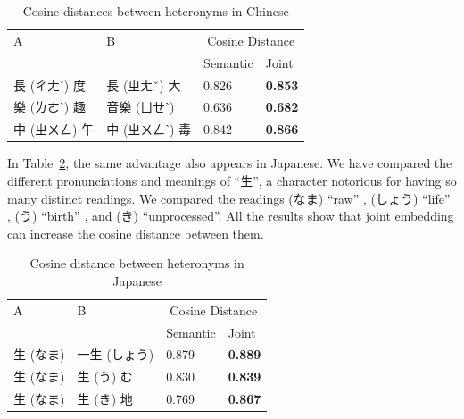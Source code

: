 \vspace{0.1cm}
\begin{table}[h]
    \centering
        \begin{tabularx}{\textwidth}{bbbb}
            \toprule
            \multirow{2.5}{*}{A} & \multirow{2.5}{*}{B} & \multicolumn{2}{c}{Cosine Distance} \\
            \cmidrule(lr){3-4} {} & {} & Semantic & Joint \\\midrule
            長 (ㄔㄤˊ) 度 & 長 (ㄓㄤˇ) 大 & 0.826 & \textbf{0.853} \\
            樂 (ㄌㄜˋ) 趣 & 音樂 (ㄩㄝˋ) & 0.636 & \textbf{0.682} \\
            中 (ㄓㄨㄥ) 午 & 中 (ㄓㄨㄥˋ) 毒 & 0.842 & \textbf{0.866} \\\bottomrule
        \end{tabularx}
    \caption{Cosine distances between heteronyms in Chinese}
    \label{tab:analysis_heteronym1}
\end{table}

\begin{CJK}{UTF8}{ipxm}
    In Table~\ref{tab:analysis_heteronym2}, the same advantage also appears in Japanese. We have compared the different pronunciations and meanings of ``生'', a character notorious for having so many distinct readings.  We compared the readings (なま) ``raw'' , (しょう) ``life'' , (う) ``birth'' , and (き) ``unprocessed''. All the results show that joint embedding can increase the cosine distance between them.
\end{CJK}

\vspace{0.1cm}    
\begin{table}[h]
    \centering
    \begin{CJK}{UTF8}{ipxm}
        \begin{tabularx}{\textwidth}{bbbb}
            \toprule
            \multirow{2.5}{*}{A} & \multirow{2.5}{*}{B} & \multicolumn{2}{c}{Cosine Distance} \\
            \cmidrule(lr){3-4} {} & {} & Semantic & Joint \\\midrule
            生 (なま) & 一生 (しょう) & 0.879 & \textbf{0.889} \\
            生 (なま) & 生 (う) む & 0.830 & \textbf{0.839} \\
            生 (なま) & 生 (き) 地 & 0.769 & \textbf{0.867} \\\bottomrule
        \end{tabularx}
    \end{CJK}
    \caption{Cosine distance between heteronyms in Japanese}
    \label{tab:analysis_heteronym2}
\end{table}

